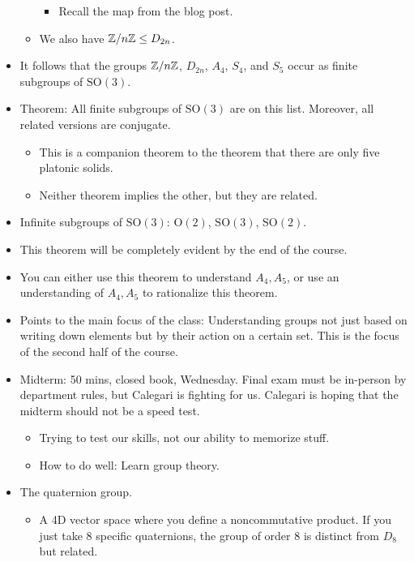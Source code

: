 \documentclass[../notes.tex]{subfiles}
\begin{document}
\begin{itemize}
\begin{itemize}
        \begin{itemize}
            \item Recall the map from the blog post.
        \end{itemize}
        \item We also have $\mathbb{Z}/n\mathbb{Z}\leq D_{2n}$.
    \end{itemize}
    \item It follows that the groups $\mathbb{Z}/n\mathbb{Z}$, $D_{2n}$, $A_4$, $S_4$, and $S_5$ occur as finite subgroups of $\text{SO}(3)$.
    \item Theorem: All finite subgroups of $\text{SO}(3)$ are on this list. Moreover, all related versions are conjugate.
    \begin{itemize}
        \item This is a companion theorem to the theorem that there are only five platonic solids.
        \item Neither theorem implies the other, but they are related.
    \end{itemize}
    \item Infinite subgroups of $\text{SO}(3)$: $\text{O}(2)$, $\text{SO}(3)$, $\text{SO}(2)$.
    \item This theorem will be completely evident by the end of the course.
    \item You can either use this theorem to understand $A_4,A_5$, or use an understanding of $A_4,A_5$ to rationalize this theorem.
    \item Points to the main focus of the class: Understanding groups not just based on writing down elements but by their action on a certain set. This is the focus of the second half of the course.
    \item Midterm: 50 mins, closed book, Wednesday. Final exam must be in-person by department rules, but Calegari is fighting for us. Calegari is hoping that the midterm should not be a speed test.
    \begin{itemize}
        \item Trying to test our skills, not our ability to memorize stuff.
        \item How to do well: Learn group theory.
    \end{itemize}
    \item The quaternion group.
    \begin{itemize}
        \item A 4D vector space where you define a noncommutative product. If you just take 8 specific quaternions, the group of order 8 is distinct from $D_8$ but related.
    \end{itemize}
\end{itemize}
\end{document}
